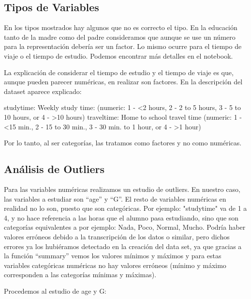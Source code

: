 \documentclass[12pt,a4paper]{article}
\begin{document}
\subsection{Tipos de Variables}
En los tipos mostrados hay algunos que no es correcto el tipo. En la educación tanto de la madre como del padre consideramos que aunque se use un número para la representación debería ser un factor. Lo mismo ocurre para el tiempo de viaje o el tiempo de estudio.  Podemos encontrar más detalles en el notebook. 


La explicación de considerar el tiempo de estudio y el tiempo de viaje es que, aunque pueden parecer numéricas, en realizar son factores. En la descripción del dataset aparece explicado:

studytime: Weekly study time: (numeric: 1 - <2 hours, 2 - 2 to 5 hours, 3 - 5 to 10 hours, or 4 - >10 hours)
traveltime: Home to school travel time (numeric: 1 - <15 min., 2 - 15 to 30 min., 3 - 30 min. to 1 hour, or 4 - >1 hour)

Por lo tanto, al ser categorías, las tratamos como factores y no como numéricas.


\subsection{Análisis de Outliers}
Para las variables numéricas realizamos un estudio de outliers. En nuestro caso, las variables a estudiar son ``age'' y ``G''. El resto de variables numéricas en realidad no lo son, puesto que son categóricas. Por ejemplo: "studytime" va de 1 a 4, y no hace referencia a las horas que el alumno pasa estudiando, sino que son categorías equivalentes a por ejemplo: Nada, Poco, Normal, Mucho. Podría haber valores erróneos debido a la transcripción de los datos o similar, pero dichos errores ya los hubiéramos detectado en la creación del data set, ya que gracias a la función ``summary'' vemos los valores mínimos y máximos y para estas variables categóricas numéricas no hay valores erróneos (mínimo y máximo corresponden a las categorías mínimas y máximas).

Procedemos al estudio de age y G:
\end{document}
